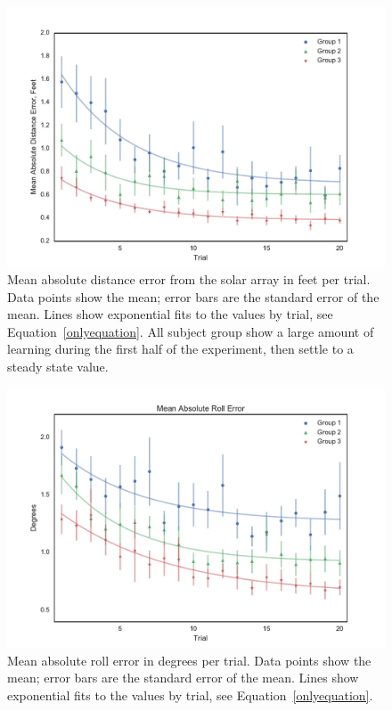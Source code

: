 \documentclass[]{aiaa-tc}%
\begin{document}
\begin{figure}[tb!]
  \centering
  \includegraphics[width=0.8\linewidth]{figs/Group_absDistErr_clean_fit_30.pdf}
  \caption[Mean absolute distance error from the solar array per trial]{Mean absolute distance error from the solar array in feet per trial. Data points show the mean; error bars are the standard error of the mean. Lines show exponential fits to the values by trial, see Equation~\ref{onlyequation}. All subject group show a large amount of learning during the first half of the experiment, then settle to a steady state value.} \label{fig:performance}
\end{figure}

\begin{figure}[tb!]
  \centering
  \includegraphics[width=0.8\linewidth]{figs/Group_absRollErr_clean_fit_30.pdf}
  \caption[Mean absolute roll error in degrees per trial]{Mean absolute roll error in degrees per trial. Data points show the mean; error bars are the standard error of the mean. Lines show exponential fits to the values by trial, see Equation~\ref{onlyequation}.}
  \label{fig:roll}
\end{figure}
\end{document}
